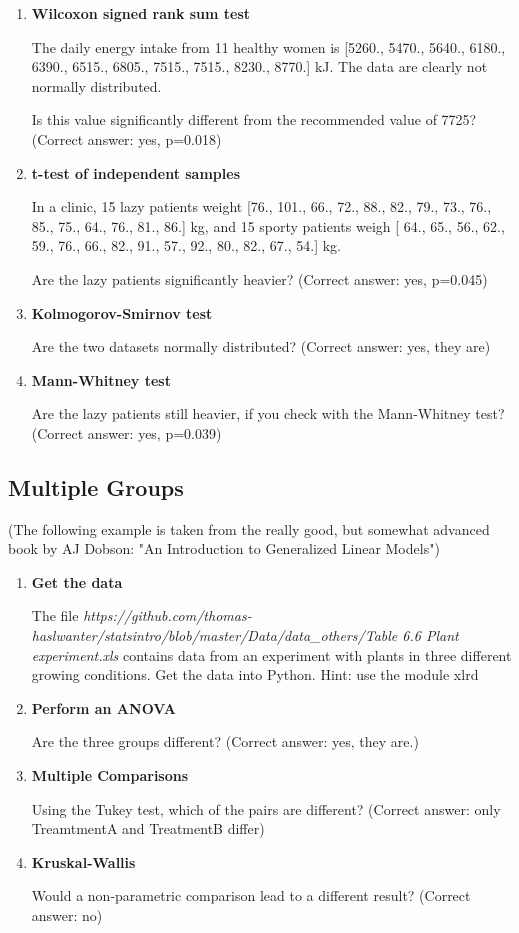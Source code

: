 \begin{enumerate}
  \item \textbf{Wilcoxon signed rank sum test}

The daily energy intake from 11 healthy women is [5260., 5470., 5640., 6180., 6390., 6515., 6805., 7515., 7515., 8230., 8770.] kJ. The data are clearly not normally distributed.

    Is this value significantly different from the recommended value of 7725?
    (Correct answer: yes, p=0.018)

  \item \textbf{t-test of independent samples}

In a clinic, 15 lazy patients weight [76., 101., 66., 72., 88., 82., 79., 73., 76., 85., 75., 64., 76., 81., 86.] kg, and 15 sporty patients weigh [ 64., 65., 56., 62., 59., 76., 66., 82., 91., 57., 92., 80., 82., 67., 54.] kg.

    Are the lazy patients significantly heavier?
    (Correct answer: yes, p=0.045)

  \item \textbf{Kolmogorov-Smirnov test}

    Are the two datasets normally distributed?
    (Correct answer: yes, they are)

  \item \textbf{Mann-Whitney test}

    Are the lazy patients still heavier, if you check with the Mann-Whitney test?
    (Correct answer: yes, p=0.039)
\end{enumerate}

\subsection{Multiple Groups}

(The following example is taken from the really good, but somewhat advanced book by AJ Dobson: "An Introduction to Generalized Linear Models")

\begin{enumerate}
  \item \textbf{Get the data}

    The file   \emph{https://github.com/thomas-haslwanter/statsintro/blob/master/Data/data\_others/Table 6.6 Plant experiment.xls} contains data from an experiment with plants in three different growing conditions. Get the data into Python.
    Hint: use the module xlrd

  \item \textbf{Perform an ANOVA}

    Are the three groups different?
    (Correct answer: yes, they are.)

  \item \textbf{Multiple Comparisons}

    Using the Tukey test, which of the pairs are different?
    (Correct answer: only TreamtmentA and TreatmentB differ)

  \item \textbf{Kruskal-Wallis}

    Would a non-parametric comparison lead to a different result?
    (Correct answer: no)

\end{enumerate}
